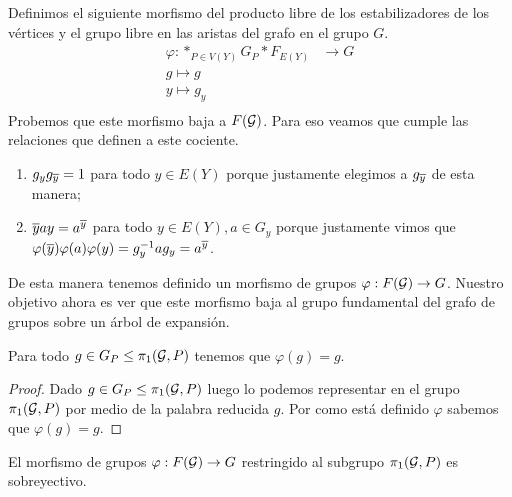 \documentclass[tesis.tex]{subfiles}
\begin{document}
Definimos el siguiente morfismo del producto libre de los estabilizadores de los vértices y el grupo libre en las aristas del grafo en el grupo $G$.
\begin{align*}
	\varphi: \ast_{P \in V(Y)} G_P \ast F_{E(Y)} &\to G	\\
	g \mapsto g \\
	y \mapsto g_y \\
\end{align*}
Probemos que este morfismo baja a $F({\cal G})$. 
Para eso veamos que cumple las relaciones que definen a este cociente.
\begin{enumerate}
	\item $g_y g_{\overline y} = 1$ para todo $y \in E(Y)$ porque justamente elegimos a $g_{\overline y}$ de esta manera;
	\item $\overline y a y = a^{\overline y}$ para todo $y \in E(Y), a \in G_y$ porque justamente vimos que $\varphi(\overline y) \varphi (a) \varphi(y) = g_y^{-1}ag_y = a^{\overline y}$.
\end{enumerate}

De esta manera tenemos definido un morfismo de grupos $\varphi: F({\cal G}) \to G$.
Nuestro objetivo ahora es ver que este morfismo baja al grupo fundamental del grafo de grupos sobre un árbol de expansión.


\begin{lema}\label{lema_morfismo_pi1_inyectivo}
	Para todo $g \in G_P \le \pi_1({\cal G}, P)$ tenemos que $\varphi(g)=g$.
\end{lema}

\begin{proof}
	Dado $g \in G_P \le \pi_1({\cal G}, P)$ luego lo podemos representar en el grupo $\pi_1({\cal G}, P)$ por medio de la palabra reducida $g$.
	Por como está definido $\varphi$ sabemos que $\varphi(g) = g$. 
\end{proof}

\begin{prop}\label{prop_morf_grp_restr_sobre}
	El morfismo de grupos $\varphi: F({\cal G}) \to G$ restringido al subgrupo $\pi_1({\cal G}, P)$ es sobreyectivo.
\end{prop}
\end{document}

